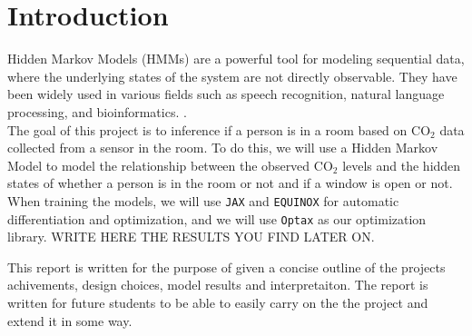 
\section{Introduction}
Hidden Markov Models (HMMs) are a powerful tool for modeling sequential data, where the underlying states of the system are not directly observable. 
They have been widely used in various fields such as speech recognition, natural language processing, and bioinformatics. \citep{ultralytics_hmm_glossary}. \\
The goal of this project is to inference if a person is in a room based on $\text{CO}_2$ data collected from a sensor in the room. 
To do this, we will use a Hidden Markov Model to model the relationship between the observed $\text{CO}_2$ levels and the hidden states of whether a person is in the room or not and if a window is open or not. 
When training the models, we will use \texttt{JAX} \citep{jax2018github}  and \texttt{EQUINOX} \citep{kidger2021equinox} for automatic differentiation and optimization,
and we will use \texttt{Optax} \citep{optax2020github} as our optimization library. \newline
WRITE HERE THE RESULTS YOU FIND LATER ON. \newline




This report is written for the purpose of given a concise outline of the projects achivements, 
design choices, model results and interpretaiton. The report is written for future students 
to be able to easily carry on the the project and extend it in some way. \newline 

  
